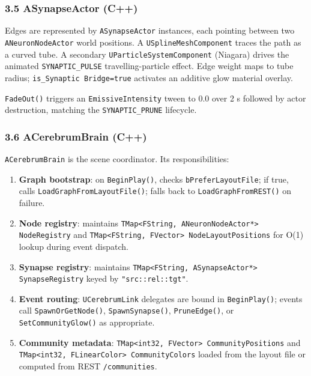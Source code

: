 \subsubsection*{3.5 ASynapseActor (C++)}

Edges are represented by \texttt{ASynapseActor} instances, each pointing between two \texttt{ANeuronNodeActor} world positions. A \texttt{USplineMeshComponent} traces the path as a curved tube. A secondary \texttt{UParticleSystemComponent} (Niagara) drives the animated \texttt{SYNAPTIC\_PULSE} travelling-particle effect. Edge weight maps to tube radius; \texttt{is\_Synaptic Bridge=true} activates an additive glow material overlay.

\texttt{FadeOut()} triggers an \texttt{EmissiveIntensity} tween to 0.0 over 2 s followed by actor destruction, matching the \texttt{SYNAPTIC\_PRUNE} lifecycle.

\subsubsection*{3.6 ACerebrumBrain (C++)}

\texttt{ACerebrumBrain} is the scene coordinator. Its responsibilities:

\begin{enumerate}
  \item \textbf{Graph bootstrap}: on \texttt{BeginPlay()}, checks \texttt{bPreferLayoutFile}; if true, calls \texttt{LoadGraphFromLayoutFile()}; falls back to \texttt{LoadGraphFromREST()} on failure.
  \item \textbf{Node registry}: maintains \texttt{TMap<FString, ANeuronNodeActor*> NodeRegistry} and \texttt{TMap<FString, FVector> NodeLayoutPositions} for O(1) lookup during event dispatch.
  \item \textbf{Synapse registry}: maintains \texttt{TMap<FString, ASynapseActor*> SynapseRegistry} keyed by \texttt{"src::rel::tgt"}.
  \item \textbf{Event routing}: \texttt{UCerebrumLink} delegates are bound in \texttt{BeginPlay()}; events call \texttt{SpawnOrGetNode()}, \texttt{SpawnSynapse()}, \texttt{PruneEdge()}, or \texttt{SetCommunityGlow()} as appropriate.
  \item \textbf{Community metadata}: \texttt{TMap<int32, FVector> CommunityPositions} and \texttt{TMap<int32, FLinearColor> CommunityColors} loaded from the layout file or computed from REST \texttt{/communities}.
\end{enumerate}


